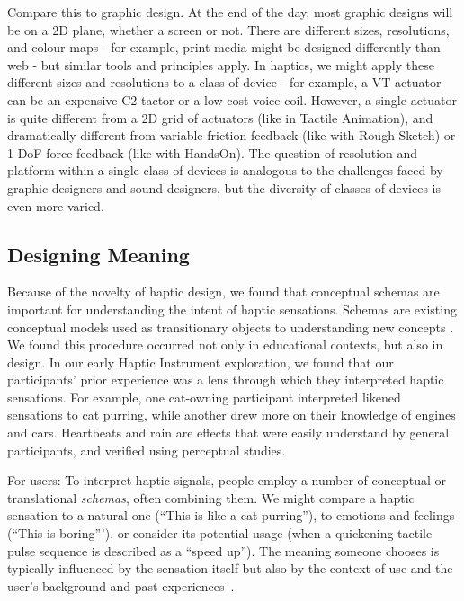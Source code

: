 Compare this to graphic design.
At the end of the day, most graphic designs will be on a 2D plane, whether a screen or not.
There are different sizes, resolutions, and colour maps - for example, print media might be designed differently than web - but similar tools and principles apply.
In haptics, we might apply these different sizes and resolutions to a class of device - for example, a VT actuator can be an expensive C2 tactor or a low-cost voice coil.
However, a single actuator is quite different from a 2D grid of actuators (like in Tactile Animation), and dramatically different from variable friction feedback (like with Rough Sketch) or 1-DoF force feedback (like with HandsOn).
The question of resolution and platform within a single class of devices is analogous to the challenges faced by graphic designers and sound designers, but the diversity of classes of devices is even more varied.




%
%
\subsection{Designing Meaning}
Because of the novelty of haptic design, we found that conceptual schemas are important for understanding the intent of haptic sensations.
Schemas are existing conceptual models used as transitionary objects to understanding new concepts \cite{Papert1980}.
We found this procedure occurred not only in educational contexts, but also in design.
In our early Haptic Instrument exploration, we found that our participants' prior experience was a lens through which they interpreted haptic sensations.
For example, one cat-owning participant interpreted likened sensations to cat purring, while another drew more on their knowledge of engines and cars.
Heartbeats and rain \cite{Israr2014} are effects that were easily understand by general participants, and verified using perceptual studies.



For users:
To interpret haptic signals, people employ a number of conceptual or translational  \textit{schemas}, often combining them.  %
We might compare a haptic sensation to a natural one (``This is like a cat purring''), 
 to emotions and feelings (``This is boring'''), or
consider its potential usage (when a quickening tactile pulse sequence is described as a ``speed up''). 
%
The meaning someone chooses is typically influenced by the sensation itself but also by the context of use and the user's background and past experiences~\cite{seifi2015vibviz, schneider2014improvising, Obrist2013}. 

